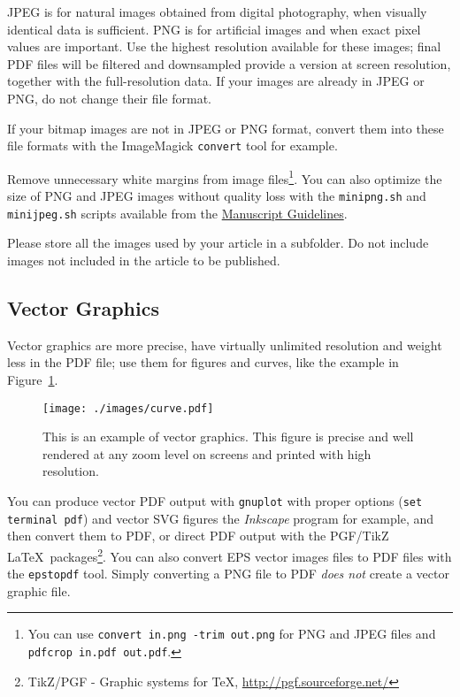 \documentclass{ipol}
\begin{document}
JPEG is for natural images obtained from digital photography, when
visually identical data is sufficient. PNG is for artificial images
and when exact pixel values are important.  Use the highest resolution
available for these images; final PDF files will be filtered and
downsampled provide a version at screen resolution, together with the
full-resolution data. If your images are already in JPEG or PNG, do
not change their file format.

If your bitmap images are not in JPEG or PNG format, convert them into
these file formats with the ImageMagick \verb|convert| tool for
example.

Remove unnecessary white margins from image files\footnote{You can use
  \verb|convert in.png -trim out.png| for PNG and JPEG files and
  \verb|pdfcrop in.pdf out.pdf|.}. You can also optimize the size of
PNG and JPEG images without quality loss with the \verb|minipng.sh| and
\verb|minijpeg.sh| scripts available from the
\href{\ipolLink}{Manuscript Guidelines}.

Please store all the images used by your article in a subfolder. Do
not include images not included in the article to be published.

\subsection{Vector Graphics}

Vector graphics are more precise, have virtually unlimited resolution
and weight less in the PDF file; use them for figures and curves, like
the example in Figure~\ref{fig:example}.

\begin{figure}[!htbp]
\begin{center}
\texttt{[image: ./images/curve.pdf]}
\caption{This is an example of vector graphics. This figure is precise
  and well rendered at any zoom level on screens and printed with high
  resolution.}
\label{fig:example}
\end{center}
\end{figure}

You can produce vector PDF output with \verb|gnuplot| with proper options
(\verb|set terminal pdf|) and vector SVG figures the \emph{Inkscape}
program for example, and then convert them to PDF, or direct PDF output with
the PGF/TikZ \LaTeX\ packages\footnote{TikZ/PGF - Graphic systems for
  TeX, \url{http://pgf.sourceforge.net/}}. You can also convert EPS
vector images files to PDF files with the \verb|epstopdf| tool.
Simply converting a PNG file to PDF \emph{does not} create a vector
graphic file.
\end{document}

